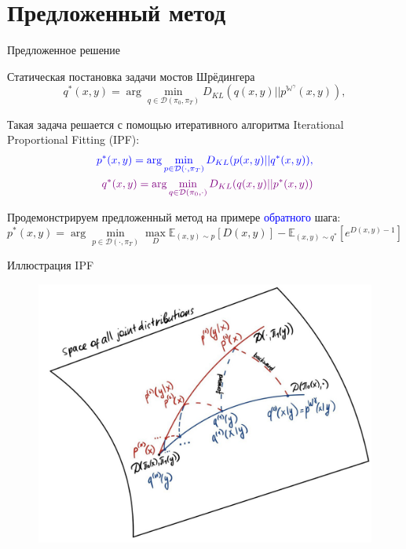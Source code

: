 \documentclass[10pt,pdf,hyperref={unicode}]{beamer}
\begin{document}
\section{Предложенный метод}
\begin{frame}{Предложенное решение}
~\\[-1mm]
\begin{block}{Статическая постановка задачи мостов Шрёдингера}
    \begin{equation}
        q^*(x,y) = \arg\min_{q\in \mathcal{D}(\pi_0, \pi_T)} D_{KL}(q(x,y)||p^{\mathbb{W}^\gamma}(x,y)),
        \label{eq:static}
    \end{equation}
\end{block}


Такая задача решается с помощью итеративного алгоритма Iterational Proportional Fitting (IPF):
\begin{equation*}
    \begin{split}
        \color{blue}p^*(x,y) = \arg\min_{p\in \mathcal{D}(\cdot, \pi_T)}D_{KL}(p(x,y)||q^*(x,y)), \\
        \color{violet}q^*(x,y) = \arg\min_{q\in \mathcal{D}(\pi_0, \cdot)}D_{KL}(q(x,y)||p^*(x,y))
    \end{split}
\end{equation*}

Продемонстрируем предложенный метод на примере \textcolor{blue}{обратного} шага:
\begin{equation*}
    p^*(x,y) = \arg\min_{p\in\mathcal{D}(\cdot, \pi_T)}\max_{D}\mathbb{E}_{(x,y)\sim p}\left[D(x,y)\right] - \mathbb{E}_{(x,y)\sim q^*}\left[e^{D(x,y) - 1}\right]
\end{equation*}

\end{frame}

\begin{frame}{Иллюстрация IPF}
~\\[-1mm]
    \begin{figure}
        \centering
        \includegraphics[width=0.8\linewidth]{slides/3d/figures/photo_2023-12-16_13-49-39.jpg}
    \end{figure}
\end{frame}
\end{document}
